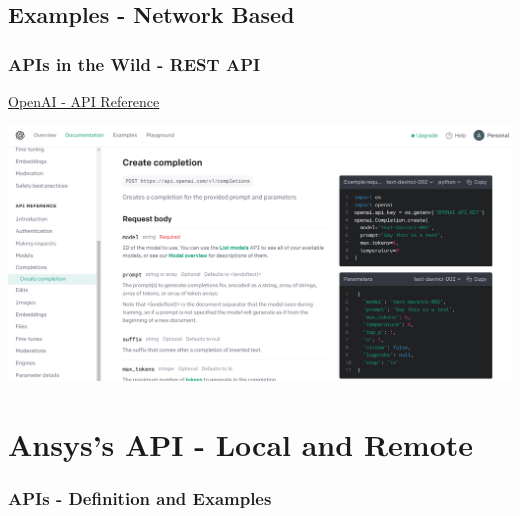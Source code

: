 \documentclass[t]{beamer}
\begin{document}
\subsection{Examples - Network Based}


\begin{frame}
  \frametitle{APIs in the Wild - REST API}
  \vspace{-10pt}

  \href{https://beta.openai.com/docs/api-reference/completions/create?lang=python}{OpenAI - API Reference}

  \centering
  \includegraphics[height=.75\textheight]{./figures/openai-api.png}

\end{frame}

\section{Ansys's API - Local and Remote}

\begin{frame}
  \frametitle{APIs - Definition and Examples}
  \tableofcontents[currentsection]
  \vspace{200pt}  %
\end{frame}
\end{document}
